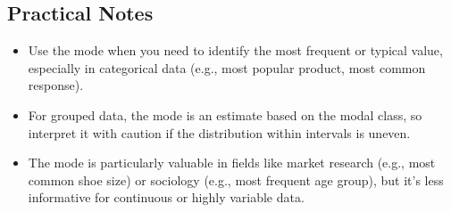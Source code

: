 \documentclass[11pt]{article}
\begin{document}
\subsection*{Practical Notes}

\begin{itemize}
    \item Use the mode when you need to identify the most frequent or typical value, especially in categorical data (e.g., most popular product, most common response).
    \item For grouped data, the mode is an estimate based on the modal class, so interpret it with caution if the distribution within intervals is uneven.
    \item The mode is particularly valuable in fields like market research (e.g., most common shoe size) or sociology (e.g., most frequent age group), but it’s less informative for continuous or highly variable data.
\end{itemize}
\end{document}
